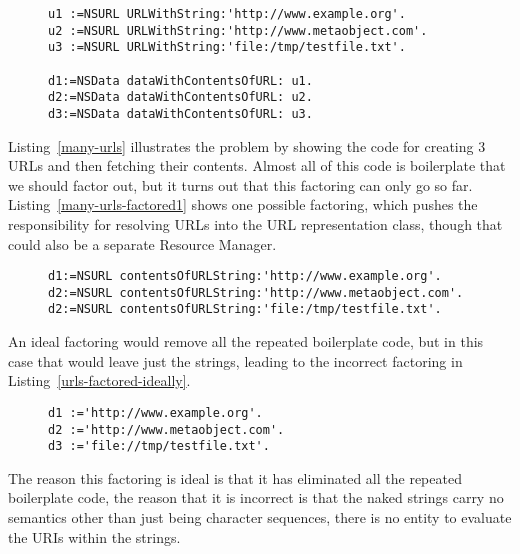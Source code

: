 \documentclass[preprint,authoryear]{acm_proc_article-sp}
\begin{document}
\begin{figure}[htbp]
\begin{lstlisting}[style=L,label=many-urls,caption=Many URLs with duplication]
u1 :=NSURL URLWithString:'http://www.example.org'.
u2 :=NSURL URLWithString:'http://www.metaobject.com'.
u3 :=NSURL URLWithString:'file:/tmp/testfile.txt'.

d1:=NSData dataWithContentsOfURL: u1.
d2:=NSData dataWithContentsOfURL: u2.
d3:=NSData dataWithContentsOfURL: u3.
\end{lstlisting}
\end{figure}

Listing~\ref{many-urls} illustrates the problem by showing the code for
creating 3 URLs and then fetching their contents.  Almost all of this code
is boilerplate that we should factor out, but it turns out that this factoring
can only go so far.  Listing~\ref{many-urls-factored1} shows one possible
factoring, which pushes the responsibility for resolving URLs into the
URL representation class, though that could also be a separate Resource 
Manager. 

\begin{figure}[htbp]
\begin{lstlisting}[style=L,label=many-urls-factored1,caption=Partial factoring]
d1:=NSURL contentsOfURLString:'http://www.example.org'.
d2:=NSURL contentsOfURLString:'http://www.metaobject.com'.
d2:=NSURL contentsOfURLString:'file:/tmp/testfile.txt'.

\end{lstlisting}
\end{figure}

An ideal factoring would remove all the repeated boilerplate code, but in this case
that would leave just the strings, leading to the incorrect factoring in Listing~\ref{urls-factored-ideally}.


\begin{figure}[htbp]
\begin{lstlisting}[style=L,label=urls-factored-ideally,caption=Ideal but incorrect factoring]
d1 :='http://www.example.org'.
d2 :='http://www.metaobject.com'.
d3 :='file://tmp/testfile.txt'.
\end{lstlisting}
\end{figure}

The reason this factoring is ideal is that it has eliminated all the repeated boilerplate code, the
reason that it is incorrect is that the naked strings carry no semantics other than just being
character sequences, there is no entity to evaluate the URIs within the strings.
\end{document}
